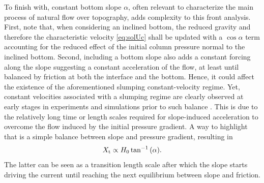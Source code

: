 \documentclass[12pt]{article}
\begin{document}
To finish with, constant bottom slope $\alpha$, often relevant to characterize the main process of natural flow over topography, adds complexity to this front analysis. First, note that, when considering an inclined bottom, the reduced gravity and therefore the characteristic velocity \eqref{eq:solUc} shall be updated with a $\cos{\alpha}$ term accounting for the reduced effect of the initial column pressure normal to the inclined bottom. Second, including a bottom slope also adds a constant forcing along the slope suggesting a constant acceleration of the flow, at least until balanced by friction at both the interface and the bottom. Hence, it could affect the existence of the aforementioned slumping constant-velocity regime.
%
Yet, constant velocities associated with a slumping regime are clearly observed at early stages in experiments and simulations prior to such balance \citep{Birman2007, Gadal2023}. This is due to the relatively long time or length scales required for slope-induced acceleration to overcome the flow induced by the initial pressure gradient. A way to highlight that is a simple balance between slope and pressure gradient, resulting in
\begin{equation}
	\label{eq:Xt_slope}
	X_{\text t} \propto H_0\tan^{-1}{(\alpha)}.
\end{equation}
The latter can be seen as a transition length scale after which the slope starts driving the current until reaching the next equilibrium between slope and friction.
\end{document}

